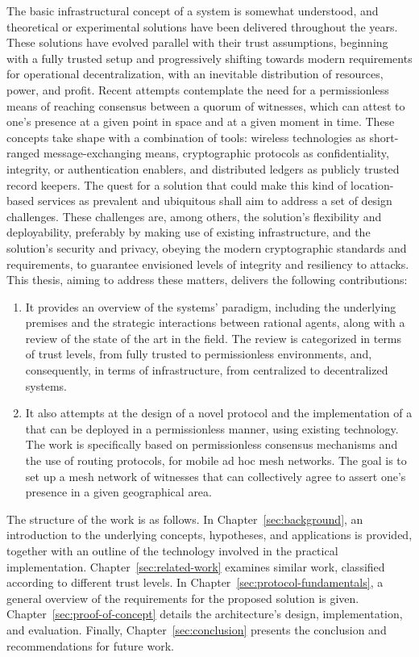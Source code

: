 The basic infrastructural concept of a \pol{} system is somewhat understood, and theoretical or experimental solutions have been delivered throughout the years. These solutions have evolved parallel with their trust assumptions, beginning with a fully trusted setup and progressively shifting towards modern requirements for operational decentralization, with an inevitable distribution of resources, power, and profit. Recent attempts contemplate the need for a permissionless means of reaching consensus between a quorum of witnesses, which can attest to one's presence at a given point in space and at a given moment in time. These concepts take shape with a combination of tools: wireless technologies as short-ranged message-exchanging means, cryptographic protocols as confidentiality, integrity, or authentication enablers, and distributed ledgers as publicly trusted record keepers. The quest for a solution that could make this kind of location-based services as prevalent and ubiquitous shall aim to address a set of design challenges. These challenges are, among others, the solution's flexibility and deployability, preferably by making use of existing infrastructure, and the solution's security and privacy, obeying the modern cryptographic standards and requirements, to guarantee envisioned levels of integrity and resiliency to attacks. This thesis, aiming to address these matters, delivers the following contributions:
\begin{enumerate}
\item It provides an overview of the \pol{} systems' paradigm, including the underlying premises and the strategic interactions between rational agents, along with a review of the state of the art in the field. The review is categorized in terms of trust levels, from fully trusted to permissionless environments, and, consequently, in terms of infrastructure, from centralized to decentralized systems.
\item It also attempts at the design of a novel \pol{} protocol and the implementation of a \poc{} that can be deployed in a permissionless manner, using existing technology. The work is specifically based on permissionless consensus mechanisms and the use of routing protocols, for mobile ad hoc mesh networks. The goal is to set up a mesh network of witnesses that can collectively agree to assert one's presence in a given geographical area.
\end{enumerate}

The structure of the work is as follows. In Chapter~\ref{sec:background}, an introduction to the underlying concepts, hypotheses, and applications is provided, together with an outline of the technology involved in the practical implementation. Chapter~\ref{sec:related-work} examines similar work, classified according to different trust levels. In Chapter~\ref{sec:protocol-fundamentals}, a general overview of the requirements for the proposed solution is given. Chapter~\ref{sec:proof-of-concept} details the architecture's design, implementation, and evaluation. Finally, Chapter~\ref{sec:conclusion} presents the conclusion and recommendations for future work.
